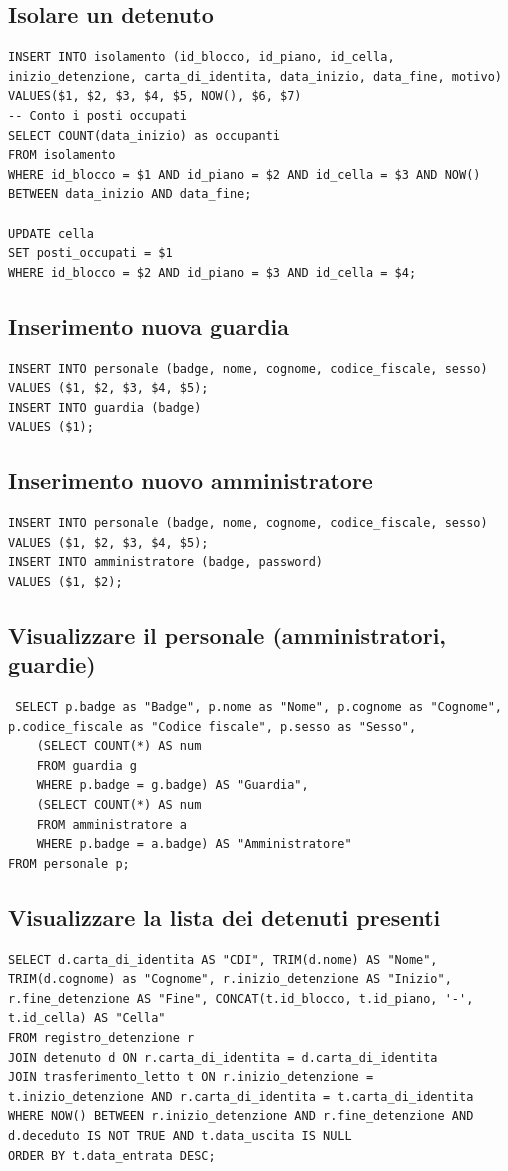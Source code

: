 \documentclass[a4paper,12pt]{report}
\begin{document}
\subsection{Isolare un detenuto}
\begin{verbatim}
INSERT INTO isolamento (id_blocco, id_piano, id_cella, inizio_detenzione, carta_di_identita, data_inizio, data_fine, motivo)
VALUES($1, $2, $3, $4, $5, NOW(), $6, $7)
-- Conto i posti occupati
SELECT COUNT(data_inizio) as occupanti
FROM isolamento
WHERE id_blocco = $1 AND id_piano = $2 AND id_cella = $3 AND NOW() BETWEEN data_inizio AND data_fine;

UPDATE cella
SET posti_occupati = $1
WHERE id_blocco = $2 AND id_piano = $3 AND id_cella = $4;
\end{verbatim}
\subsection{Inserimento nuova guardia}
\begin{verbatim}
INSERT INTO personale (badge, nome, cognome, codice_fiscale, sesso)
VALUES ($1, $2, $3, $4, $5);
INSERT INTO guardia (badge)
VALUES ($1);
\end{verbatim}
\subsection{Inserimento nuovo amministratore}
\begin{verbatim}
INSERT INTO personale (badge, nome, cognome, codice_fiscale, sesso)
VALUES ($1, $2, $3, $4, $5);
INSERT INTO amministratore (badge, password)
VALUES ($1, $2);
\end{verbatim}
\subsection{Visualizzare il personale (amministratori, guardie)}
\begin{verbatim}
 SELECT p.badge as "Badge", p.nome as "Nome", p.cognome as "Cognome", p.codice_fiscale as "Codice fiscale", p.sesso as "Sesso", 
    (SELECT COUNT(*) AS num
    FROM guardia g
    WHERE p.badge = g.badge) AS "Guardia",
    (SELECT COUNT(*) AS num
    FROM amministratore a
    WHERE p.badge = a.badge) AS "Amministratore"
FROM personale p;
\end{verbatim}
\subsection{Visualizzare la lista dei detenuti presenti}
\begin{verbatim}
SELECT d.carta_di_identita AS "CDI", TRIM(d.nome) AS "Nome", TRIM(d.cognome) as "Cognome", r.inizio_detenzione AS "Inizio", r.fine_detenzione AS "Fine", CONCAT(t.id_blocco, t.id_piano, '-', t.id_cella) AS "Cella"
FROM registro_detenzione r
JOIN detenuto d ON r.carta_di_identita = d.carta_di_identita
JOIN trasferimento_letto t ON r.inizio_detenzione = t.inizio_detenzione AND r.carta_di_identita = t.carta_di_identita
WHERE NOW() BETWEEN r.inizio_detenzione AND r.fine_detenzione AND d.deceduto IS NOT TRUE AND t.data_uscita IS NULL
ORDER BY t.data_entrata DESC;
\end{verbatim}
\end{document}
